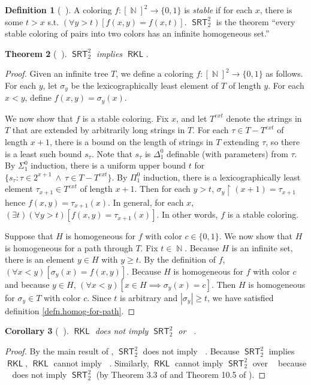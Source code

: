 \documentclass{amsart}
\theoremstyle{plain}
\newtheorem{theorem}{Theorem}
\newtheorem{corollary}[theorem]{Corollary}
\theoremstyle{remark}
\theoremstyle{definition}
\newtheorem{defn}[theorem]{Definition}
\DeclareMathOperator{\RCA}{\mathsf{RCA}_0}
\DeclareMathOperator{\SRT}{\mathsf{SRT}}
\DeclareMathOperator{\WKL}{\mathsf{WKL}_0}
\DeclareMathOperator{\RKL}{\mathsf{RKL}}
\DeclareMathOperator{\N}{\mathbb{N}}
\begin{document}
\begin{defn}[$\RCA$]
	A coloring $f:[\N]^2\rightarrow\{0,1\}$ is \emph{stable} if for each $x$, there is some $t>x$ s.t. $(\forall y>t)[f(x,y)=f(x,t)]$.
	$\SRT^2_2$ is the theorem ``every stable coloring of pairs into two colors has an infinite homogeneous set.''
\end{defn}

\begin{theorem}[$\RCA$]
$\SRT^2_2$ implies $\RKL$.
\end{theorem}
\begin{proof} 
Given an infinite tree $T$, we define a coloring $f:[\N]^2\rightarrow \{0,1\}$ as follows.  For each $y$, let $\sigma_y$ be the lexicographically least element of $T$ of length $y$.  For each $x<y$, define $f(x,y)=\sigma_y(x)$.\par
	We now show that $f$ is a stable coloring.  Fix $x$, and let $T^{ext}$ denote the strings in $T$ that are extended by arbitrarily long strings in $T$.
	For each $\tau\in T-T^{ext}$ of length $x+1$, there is a bound on the length of strings in $T$ extending $\tau$, so there is a least such bound $s_{\tau}$. 
	Note that $s_{\tau}$ is $\Delta^0_1$ definable (with parameters) from $\tau$.  By $\Sigma^0_1$ induction, there is a uniform upper bound $t$ for $\{s_{\tau}: \tau\in 2^{x+1}\ \land\ \tau\in T-T^{ext}\}$. 
	By $\Pi^0_1$ induction, there is a lexicographically least element $\tau_{x+1}\in T^{ext}$ of length $x+1$. 
	Then for each $y>t$, $\sigma_y\upharpoonright (x+1)=\tau_{x+1}$ hence $f(x,y)=\tau_{x+1}(x)$.
In general, for each $x$, $(\exists t)(\forall y>t)[f(x,y)=\tau_{x+1}(x)]$. In other words, $f$ is a stable coloring.\par
	Suppose that $H$ is homogeneous for $f$ with color $c\in\{0,1\}$.  We now show that $H$ is homogeneous for a path through $T$.  
	Fix $t\in\N$.  Because $H$ is an infinite set, there is an element $y\in H$ with $y\geq t$.  By the definition of $f$, $(\forall x<y)[\sigma_y(x)=f(x,y)]$.  Because $H$ is homogeneous for $f$ with color $c$ and because $y\in H$, $(\forall x<y)[x\in H\implies\sigma_y(x)=c]$.  Then $H$ is homogeneous for $\sigma_y \in T$ with color $c$.  Since $t$ is arbitrary and $|\sigma_y|\geq t$, we have satisfied definition \ref{defn.homog-for-path}.
\end{proof}



\begin{corollary}[$\RCA$]
$\RKL$ does not imply $\SRT^2_2$ or $\WKL$. 
\end{corollary}
\begin{proof}
By the main result of \cite{liu}, $\SRT^2_2$ does not imply $\WKL$. 
Because $\SRT^2_2$ implies $\RKL$, $\RKL$ cannot imply $\WKL$. 
Similarly, $\RKL$ cannot imply $\SRT^2_2$ over $\RCA$ because $\WKL$ does not imply $\SRT^2_2$ (by Theorem 3.3 of \cite{seetapun} and Theorem 10.5 of \cite{CJS}).
\end{proof}
\end{document}
